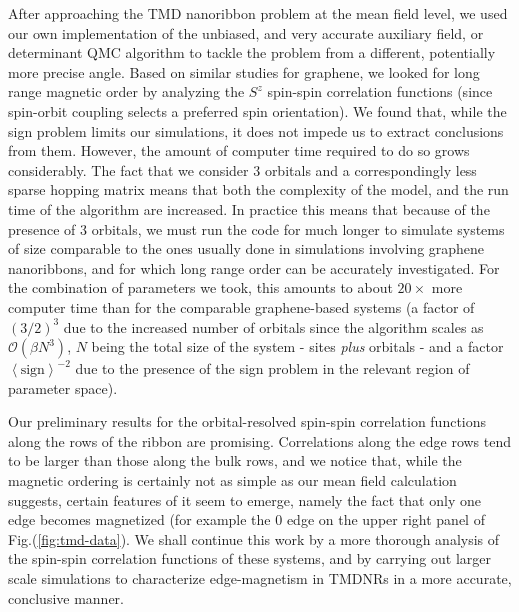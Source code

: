 \vspace{-0.18cm}
After approaching the \acs{TMD} nanoribbon problem at the mean field level, we used our own implementation of the unbiased, and very accurate auxiliary field, or determinant \ac{QMC} algorithm to tackle the problem from a different, potentially more precise angle.
Based on similar studies for graphene, we looked for long range magnetic order by analyzing the $S^z$ spin-spin correlation functions (since spin-orbit coupling selects a preferred spin orientation).
We found that, while the sign problem limits our simulations, it does not impede us to extract conclusions from them.
However, the amount of computer time required to do so grows considerably.
The fact that we consider 3 orbitals and a correspondingly less sparse hopping matrix means that both the complexity of the model, and the run time of the algorithm are increased.
In practice this means that because of the presence of 3 orbitals, we must run the code for much longer to simulate systems of size comparable to the ones usually done in simulations involving graphene nanoribbons, and for which long range order can be accurately investigated.
For the combination of parameters we took, this amounts to about $20 \times$ more computer time than for the comparable graphene-based systems (a factor of $(3 /2)^3$ due to the increased number of orbitals since the algorithm scales as $\mathcal{O}(\beta N^3)$, $N$ being the total size of the system - sites \emph{plus} orbitals - and a factor $\left\langle \text{sign} \right\rangle^{-2}$ due to the presence of the sign problem in the relevant region of parameter space).

Our preliminary results for the orbital-resolved spin-spin correlation functions along the rows of the ribbon are promising. Correlations along the edge rows tend to be larger than those along the bulk rows, and we notice that, while the magnetic ordering is certainly not as simple as our mean field calculation suggests, certain features of it seem to emerge, namely the fact that only one edge becomes magnetized (for example the $0$ edge on the upper right panel of Fig.(\ref{fig:tmd-data}).
We shall continue this work by a more thorough analysis of the spin-spin correlation functions of these systems, and by carrying out larger scale simulations to characterize edge-magnetism in \acp{TMDNR} in a more accurate,  conclusive manner.

\clearpage